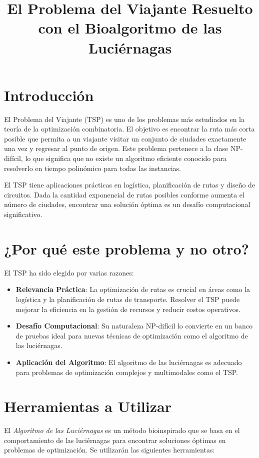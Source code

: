 \documentclass{article}
\title{El Problema del Viajante Resuelto con el Bioalgoritmo de las Luciérnagas}
\author{}
\date{}
\begin{document}
\maketitle

\section{Introducción}
El Problema del Viajante (TSP) es uno de los problemas más estudiados en la teoría de la optimización combinatoria. El objetivo es encontrar la ruta más corta posible que permita a un viajante visitar un conjunto de ciudades exactamente una vez y regresar al punto de origen. Este problema pertenece a la clase NP-difícil, lo que significa que no existe un algoritmo eficiente conocido para resolverlo en tiempo polinómico para todas las instancias.

El TSP tiene aplicaciones prácticas en logística, planificación de rutas y diseño de circuitos. Dada la cantidad exponencial de rutas posibles conforme aumenta el número de ciudades, encontrar una solución óptima es un desafío computacional significativo.

\section{¿Por qué este problema y no otro?}
El TSP ha sido elegido por varias razones:

\begin{itemize}
    \item \textbf{Relevancia Práctica}: La optimización de rutas es crucial en áreas como la logística y la planificación de rutas de transporte. Resolver el TSP puede mejorar la eficiencia en la gestión de recursos y reducir costos operativos.
    \item \textbf{Desafío Computacional}: Su naturaleza NP-difícil lo convierte en un banco de pruebas ideal para nuevas técnicas de optimización como el algoritmo de las luciérnagas.
    \item \textbf{Aplicación del Algoritmo}: El algoritmo de las luciérnagas es adecuado para problemas de optimización complejos y multimodales como el TSP.
\end{itemize}

\section{Herramientas a Utilizar}
El \textit{Algoritmo de las Luciérnagas} es un método bioinspirado que se basa en el comportamiento de las luciérnagas para encontrar soluciones óptimas en problemas de optimización. Se utilizarán las siguientes herramientas:
\end{document}
